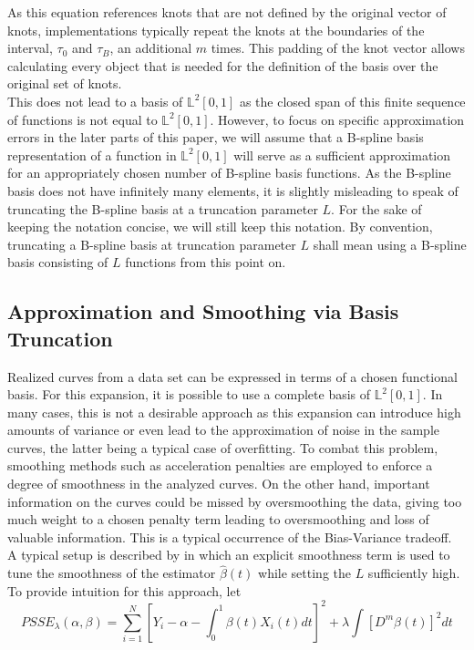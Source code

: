 \documentclass[11pt,twoside,a4paper]{article}
\begin{document}
	As this equation references knots that are not defined by the original vector of knots, implementations typically repeat the knots at the boundaries of the interval, $\tau_0$ and $\tau_B$, an additional $m$ times. This padding of the knot vector allows calculating every object that is needed for the definition of the basis over the original set of knots.\\	
	This does not lead to a basis of $\mathbb{L}^2[0,1]$ as the closed span of this finite sequence of functions is not equal to $\mathbb{L}^2[0,1]$. However, to focus on specific approximation errors in the later parts of this paper, we will assume that a B-spline basis representation of a function in $\mathbb{L}^2[0,1]$ will serve as a sufficient approximation for an appropriately chosen number of B-spline basis functions. 
	As the B-spline basis does not have infinitely many elements, it is slightly misleading to speak of truncating the B-spline basis at a truncation parameter $L$. For the sake of keeping the notation concise, we will still keep this notation. By convention, truncating a B-spline basis at truncation parameter $L$ shall mean using a B-spline basis consisting of $L$ functions from this point on.
	
	\subsection{Approximation and Smoothing via Basis Truncation}
	Realized curves from a data set can be expressed in terms of a chosen functional basis. For this expansion, it is possible to use a complete basis of $\mathbb{L}^2[0,1]$. In many cases, this is not a desirable approach as this expansion can introduce high amounts of variance or even lead to the approximation of noise in the sample curves, the latter being a typical case of overfitting. To combat this problem, smoothing methods such as acceleration penalties are employed to enforce a degree of smoothness in the analyzed curves. On the other hand, important information on the curves could be missed by oversmoothing the data, giving too much weight to a chosen penalty term leading to oversmoothing and loss of valuable information. This is a typical occurrence of the Bias-Variance tradeoff.\\
	
	A typical setup is described by \cite{Goldsmith_2011} in which an explicit smoothness term is used to tune the smoothness of the estimator $\hat{\beta}(t)$ while setting the $L$ sufficiently high. To provide intuition for this approach, let 
	\begin{equation}
		PSSE_\lambda(\alpha, \beta) = \sum_{i = 1}^{N} \left[ Y_i -\alpha -\int_0^1 \beta(t)X_i(t)dt \right]^2 + \lambda \int \left[D^m\beta(t)\right]^2 dt
	\end{equation}
	
\end{document}
